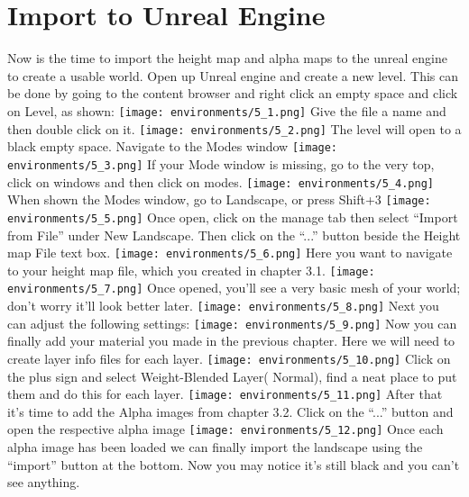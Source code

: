 \documentclass[../main.tex]{subfiles}
\begin{document}
\section {Import to Unreal Engine}
Now is the time to import the height map and alpha maps to the unreal engine to create a usable world.
Open up Unreal engine and create a new level. This can be done by going to the content browser and right click an empty space and click on Level, as shown:
\texttt{[image: environments/5\_1.png]}
Give the file a name and then double click on it.
\texttt{[image: environments/5\_2.png]}
The level will open to a black empty space. Navigate to the Modes window 
\texttt{[image: environments/5\_3.png]}
If your Mode window is missing, go to the very top, click on windows and then click on modes.
\texttt{[image: environments/5\_4.png]}
When shown the Modes window, go to Landscape, or press Shift+3
\texttt{[image: environments/5\_5.png]}
Once open, click on the manage tab then select “Import from File” under New Landscape. Then click on the “...” button beside the Height map File text box.
\texttt{[image: environments/5\_6.png]}
Here you want to navigate to your height map file, which you created in chapter 3.1. 
\texttt{[image: environments/5\_7.png]}
Once opened, you’ll see a very basic mesh of your world; don’t worry it’ll look better later.
\texttt{[image: environments/5\_8.png]}
Next you can adjust the following settings:
\texttt{[image: environments/5\_9.png]}
Now you can finally add your material you made in the previous chapter. Here we will need to create layer info files for each layer.
\texttt{[image: environments/5\_10.png]}
Click on the plus sign and select Weight-Blended Layer( Normal), find a neat place to put them and do this for each layer.
\texttt{[image: environments/5\_11.png]}
After that it’s time to add the Alpha images from chapter 3.2. Click on the “...” button and open the respective alpha image
\texttt{[image: environments/5\_12.png]}
Once each alpha image has been loaded we can finally import the landscape using the “import” button at the bottom.
Now you may notice it’s still black and you can’t see anything.
\end{document}
